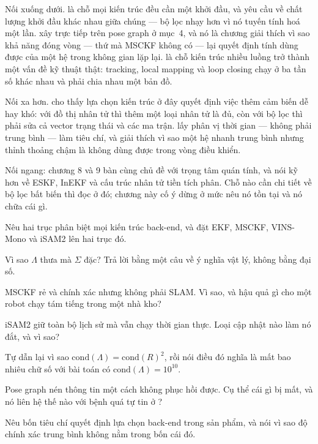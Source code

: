 \documentclass[../../vslam.tex]{subfiles}
\begin{document}
Nối xuống dưới.  là chỗ mọi kiến trúc đều cần một khởi đầu, và yêu cầu về chất lượng khởi đầu khác nhau giữa chúng --- bộ lọc nhạy hơn vì nó tuyến tính hoá một lần.  xây trực tiếp trên pose graph ở mục~4, và nó là chương giải thích vì sao khả năng đóng vòng --- thứ mà MSCKF không có --- lại quyết định tính dùng được của một hệ trong không gian lặp lại.  là chỗ kiến trúc nhiều luồng trở thành một vấn đề kỹ thuật thật: tracking, local mapping và loop closing chạy ở ba tần số khác nhau và phải chia nhau một bản đồ.

Nối xa hơn.  cho thấy lựa chọn kiến trúc ở đây quyết định việc thêm cảm biến dễ hay khó: với đồ thị nhân tử thì thêm một loại nhân tử là đủ, còn với bộ lọc thì phải sửa cả vector trạng thái và các ma trận.  lấy phân vị thời gian --- không phải trung bình --- làm tiêu chí, và giải thích vì sao một hệ nhanh trung bình nhưng thỉnh thoảng chậm là không dùng được trong vòng điều khiển.

Nối ngang:  chương 8 và 9 bàn cùng chủ đề với trọng tâm quán tính, và nói kỹ hơn về ESKF, InEKF và cấu trúc nhân tử tiền tích phân. Chỗ nào cần chi tiết về bộ lọc bất biến thì đọc ở đó; chương này cố ý dừng ở mức nêu nó tồn tại và nó chữa cái gì.

\begin{tukiem}
\item Nêu hai trục phân biệt mọi kiến trúc back-end, và đặt EKF, MSCKF, VINS-Mono và iSAM2 lên hai trục đó.
\item Vì sao \(\Lambda\) thưa mà \(\Sigma\) đặc? Trả lời bằng một câu về ý nghĩa vật lý, không bằng đại số.
\item MSCKF rẻ và chính xác nhưng không phải SLAM. Vì sao, và hậu quả gì cho một robot chạy tám tiếng trong một nhà kho?
\item iSAM2 giữ toàn bộ lịch sử mà vẫn chạy thời gian thực. Loại cập nhật nào làm nó đắt, và vì sao?
\item Tự dẫn lại vì sao \(\mathrm{cond}(\Lambda) = \mathrm{cond}(R)^2\), rồi nói điều đó nghĩa là mất bao nhiêu chữ số với bài toán có \(\mathrm{cond}(\Lambda) = 10^{10}\).
\item Pose graph nén thông tin một cách không phục hồi được. Cụ thể cái gì bị mất, và nó liên hệ thế nào với bệnh quá tự tin ở ?
\item Nêu bốn tiêu chí quyết định lựa chọn back-end trong sản phẩm, và nói vì sao độ chính xác trung bình không nằm trong bốn cái đó.
\end{tukiem}
\ifSubfilesClassLoaded{\printbibliography[title={Nguồn}]}{}
\end{document}
